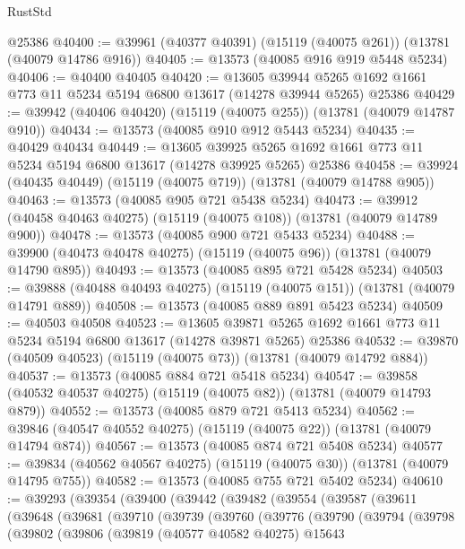 \begin{lexlean}{RustStd}
\begin{coremodule}
    @25386
@40400 := @39961 (@40377 @40391) (@15119 (@40075 @261)) (@13781 (@40079 @14786 @916))
@40405 := @13573 (@40085 @916 @919 @5448 @5234)
@40406 := @40400 @40405
@40420 := @13605
    @39944
    @5265
    @1692
    @1661
    @773
    @11
    @5234
    @5194
    @6800
    @13617
    (@14278 @39944 @5265)
    @25386
@40429 := @39942 (@40406 @40420) (@15119 (@40075 @255)) (@13781 (@40079 @14787 @910))
@40434 := @13573 (@40085 @910 @912 @5443 @5234)
@40435 := @40429 @40434
@40449 := @13605
    @39925
    @5265
    @1692
    @1661
    @773
    @11
    @5234
    @5194
    @6800
    @13617
    (@14278 @39925 @5265)
    @25386
@40458 := @39924 (@40435 @40449) (@15119 (@40075 @719)) (@13781 (@40079 @14788 @905))
@40463 := @13573 (@40085 @905 @721 @5438 @5234)
@40473 := @39912 (@40458 @40463 @40275) (@15119 (@40075 @108)) (@13781 (@40079 @14789 @900))
@40478 := @13573 (@40085 @900 @721 @5433 @5234)
@40488 := @39900 (@40473 @40478 @40275) (@15119 (@40075 @96)) (@13781 (@40079 @14790 @895))
@40493 := @13573 (@40085 @895 @721 @5428 @5234)
@40503 := @39888 (@40488 @40493 @40275) (@15119 (@40075 @151)) (@13781 (@40079 @14791 @889))
@40508 := @13573 (@40085 @889 @891 @5423 @5234)
@40509 := @40503 @40508
@40523 := @13605
    @39871
    @5265
    @1692
    @1661
    @773
    @11
    @5234
    @5194
    @6800
    @13617
    (@14278 @39871 @5265)
    @25386
@40532 := @39870 (@40509 @40523) (@15119 (@40075 @73)) (@13781 (@40079 @14792 @884))
@40537 := @13573 (@40085 @884 @721 @5418 @5234)
@40547 := @39858 (@40532 @40537 @40275) (@15119 (@40075 @82)) (@13781 (@40079 @14793 @879))
@40552 := @13573 (@40085 @879 @721 @5413 @5234)
@40562 := @39846 (@40547 @40552 @40275) (@15119 (@40075 @22)) (@13781 (@40079 @14794 @874))
@40567 := @13573 (@40085 @874 @721 @5408 @5234)
@40577 := @39834 (@40562 @40567 @40275) (@15119 (@40075 @30)) (@13781 (@40079 @14795 @755))
@40582 := @13573 (@40085 @755 @721 @5402 @5234)
@40610 := @39293
    (@39354
      (@39400
        (@39442
          (@39482
            (@39554
              (@39587
                (@39611
                  (@39648
                    (@39681
                      (@39710
                        (@39739
                          (@39760
                            (@39776
                              (@39790
                                (@39794
                                  (@39798
                                    (@39802
                                      (@39806
                                        (@39819
                                          (@40577 @40582 @40275)
                                          @15643

\end{coremodule}
\end{lexlean}
